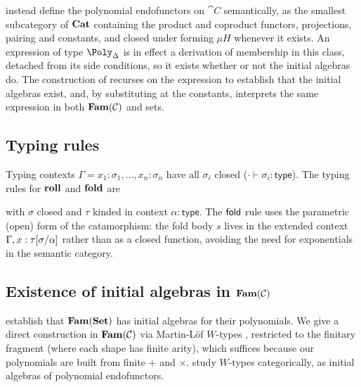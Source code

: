 \citet[Definition~6]{nunes2023} instead define the polynomial endofunctors on $\cat{C}$
semantically, as the smallest subcategory of $\mathbf{Cat}$ containing the product and coproduct functors,
projections, pairing and constants, and closed under forming $\mu H$ whenever it exists. An expression
of type $\Poly_\Delta$ is in effect a derivation of membership in this class, detached from its side
conditions, so it exists whether or not the initial algebras do. The construction of
 recurses on the expression to establish that the initial algebras exist,
and, by substituting at the constants, interprets the same expression in both $\mathbf{Fam}(\mathcal{C})$ and sets.

\subsection{Typing rules}
\label{sec:polynomial-types:language}

Typing contexts $\Gamma = x_1 : \sigma_1, \ldots, x_n : \sigma_n$ have all $\sigma_i$ closed
($\cdot \vdash \sigma_i : \mathsf{type}$). The typing rules for $\mathbf{roll}$ and $\mathbf{fold}$ are
with $\sigma$ closed and $\tau$ kinded in context $\alpha : \mathsf{type}$. The $\mathsf{fold}$ rule uses the
parametric (open) form of the catamorphism: the fold body $s$ lives in the extended context $\Gamma, x :
\tau[\sigma/\alpha]$ rather than as a closed function, avoiding the need for exponentials in the
semantic category.

\subsection{Existence of initial algebras in $\mathbf{Fam}(\mathcal{C})$}
\label{sec:polynomial-types:fam}

\citet[Proposition~81]{nunes2023} establish that $\mathbf{Fam}(\mathbf{Set})$ has initial algebras for their polynomials. We
give a direct construction in $\mathbf{Fam}(\mathcal{C})$ via Martin-L\"of $W$-types
\citep[Wellorderings, pp.~43--47]{martinLof1984}, restricted to the finitary fragment (where each shape has
finite arity), which suffices because our polynomials are built from finite $+$ and $\times$.
\citet{moerdijk-palmgren00} study $W$-types categorically, as initial algebras of polynomial
endofunctors.


